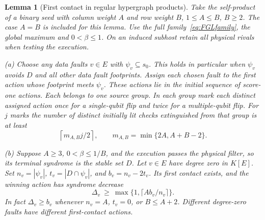 \documentclass[10pt,twocolumn]{article}
\newtheorem{lemma}[theorem]{Lemma}
\theoremstyle{definition}
\begin{document}
\begin{lemma}[First contact in regular hypergraph products]\label{lem:first-contact}
Take the self-product of a binary seed with column weight $A$ and row
weight $B$, $1\le A\le B$, $B\ge2$. The case $A=B$ is included for
this lemma. Use the full family~\eqref{eq:FGLfamily}, the global
maximum and $0<\beta\le1$. On an induced subhost retain all physical
rivals when testing the execution.

\textup{(a)} Choose any data faults $v\in E$ with $\psi_v\subseteq s_0$.
This holds in particular when $\psi_v$ avoids $D$ and all other data
fault footprints. Assign each chosen fault to the first action whose
footprint meets $\psi_v$. These actions lie in the initial sequence
of score-one actions. Each belongs to one source group. In each group
mark each distinct assigned action once for a single-qubit flip and
twice for a multiple-qubit flip. For $j$ marks the number of distinct
initially lit checks extinguished from that group is at least
\[
 \left\lceil m_{A,B}j/2\right\rceil,\qquad
 m_{A,B}=\min\{2A,A+B-2\}.
\]

\textup{(b)} Suppose $A\ge3$, $0<\beta\le1/B$, and the execution
passes the physical filter, so its terminal syndrome is the stable
set $D$. Let $v\in E$ have degree zero in $K[E]$. Set $n_v=|\psi_v|$,
$t_v=|D\cap\psi_v|$, and $b_v=n_v-2t_v$. Its first contact exists,
and the winning action has syndrome decrease
\[
 \Delta_v\ \ge\ \max\{1,\lceil A b_v/n_v\rceil\}.
\]
In fact $\Delta_v\ge b_v$ whenever $n_v=A$, $t_v=0$, or $B\le A+2$.
Different degree-zero faults have different first-contact actions.
\end{lemma}
\end{document}
